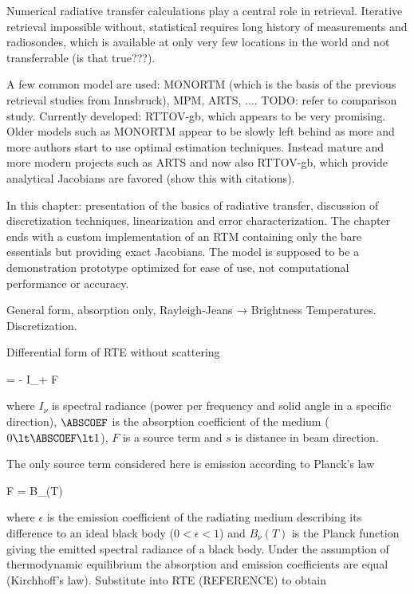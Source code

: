 Numerical radiative transfer calculations play a central role in retrieval.
Iterative retrieval impossible without, statistical requires long history of
measurements and radiosondes, which is available at only very few locations in
the world and not transferrable (is that true???).

A few common model are used: MONORTM (which is the basis of the previous
retrieval studies from Innsbruck), MPM, ARTS, .... TODO: refer to comparison
study. Currently developed: RTTOV-gb, which appears to be very promising.
Older models such as MONORTM appear to be slowly left behind as more and more
authors start to use optimal estimation techniques. Instead mature and more
modern projects such as ARTS and now also RTTOV-gb, which provide analytical
Jacobians are favored (show this with citations).

In this chapter: presentation of the basics of radiative transfer, discussion
of discretization techniques, linearization and error characterization. The
chapter ends with a custom implementation of an RTM containing only the bare
essentials but providing exact Jacobians. The model is supposed to
be a demonstration prototype optimized for ease of use, not computational
performance or accuracy.


\startsection[title=The Radiative Transfer Equation]

    General form, absorption only, Rayleigh-Jeans → Brightness Temperatures.
    Discretization.

    Differential form of RTE without scattering

    \startformula
         = - I_\nu \ABSCOEF + F \EQCOMMA
    \stopformula

    where $I_\nu$ is spectral radiance (power per frequency and solid angle in
    a specific direction), $\ABSCOEF$ is the absorption coefficient of the medium
    ($0 \lt \ABSCOEF \lt 1$), $F$ is a source term and $s$ is distance in beam
    direction.

    The only source term considered here is emission according to Planck's law

    \startformula
        F = \epsilon B_\nu(T) \EQCOMMA
    \stopformula

    where $\epsilon$ is the emission coefficient of the radiating medium
    describing its difference to an ideal black body ($0 \lt \epsilon \lt 1$)
    and $B_\nu(T)$ is the Planck function giving the emitted spectral radiance
    of a black body. Under the assumption of thermodynamic equilibrium the
    absorption and emission coefficients are equal (Kirchhoff's law).
    Substitute into RTE (REFERENCE) to obtain

